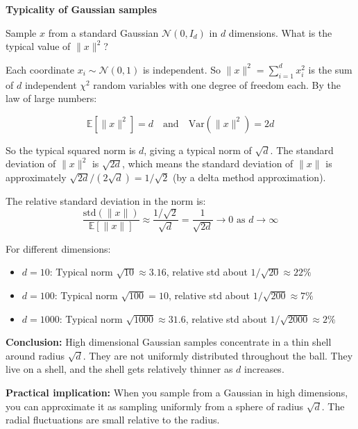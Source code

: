 \begin{examplebox}
\textbf{Typicality of Gaussian samples}

\vspace{0.5em}

Sample $x$ from a standard Gaussian $\mathcal{N}(0, I_d)$ in $d$ dimensions. What is the typical value of $\|x\|^2$?

\vspace{0.5em}

Each coordinate $x_i \sim \mathcal{N}(0, 1)$ is independent. So $\|x\|^2 = \sum_{i=1}^d x_i^2$ is the sum of $d$ independent $\chi^2$ random variables with one degree of freedom each. By the law of large numbers:

\begin{equation*}
\mathbb{E}[\|x\|^2] = d \quad \text{and} \quad \text{Var}(\|x\|^2) = 2d
\end{equation*}

So the typical squared norm is $d$, giving a typical norm of $\sqrt{d}$. The standard deviation of $\|x\|^2$ is $\sqrt{2d}$, which means the standard deviation of $\|x\|$ is approximately $\sqrt{2d}/(2\sqrt{d}) = 1/\sqrt{2}$ (by a delta method approximation).

\vspace{0.5em}

The relative standard deviation in the norm is:
\begin{equation*}
\frac{\text{std}(\|x\|)}{\mathbb{E}[\|x\|]} \approx \frac{1/\sqrt{2}}{\sqrt{d}} = \frac{1}{\sqrt{2d}} \to 0 \text{ as } d \to \infty
\end{equation*}

\vspace{0.5em}

For different dimensions:

\begin{itemize}
\item $d = 10$: Typical norm $\sqrt{10} \approx 3.16$, relative std about $1/\sqrt{20} \approx 22\%$

\item $d = 100$: Typical norm $\sqrt{100} = 10$, relative std about $1/\sqrt{200} \approx 7\%$

\item $d = 1000$: Typical norm $\sqrt{1000} \approx 31.6$, relative std about $1/\sqrt{2000} \approx 2\%$
\end{itemize}

\vspace{0.5em}

\textbf{Conclusion:} High dimensional Gaussian samples concentrate in a thin shell around radius $\sqrt{d}$. They are not uniformly distributed throughout the ball. They live on a shell, and the shell gets relatively thinner as $d$ increases.

\vspace{0.5em}

\textbf{Practical implication:} When you sample from a Gaussian in high dimensions, you can approximate it as sampling uniformly from a sphere of radius $\sqrt{d}$. The radial fluctuations are small relative to the radius.
\end{examplebox}

